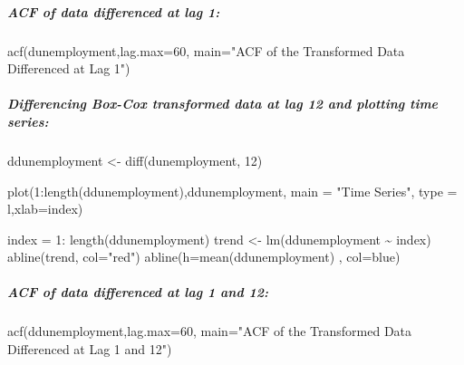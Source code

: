 \documentclass[
  letterpaper,
  DIV=11,
  numbers=noendperiod]{scrartcl}
\let\oldsubparagraph\subparagraph
\renewcommand{\subparagraph}[1]{\oldsubparagraph{#1}\mbox{}}
\newenvironment{Shaded}{\begin{snugshade}}{\end{snugshade}}
\newcommand{\AttributeTok}[1]{\textcolor[rgb]{0.40,0.45,0.13}{#1}}
\newcommand{\DecValTok}[1]{\textcolor[rgb]{0.68,0.00,0.00}{#1}}
\newcommand{\FunctionTok}[1]{\textcolor[rgb]{0.28,0.35,0.67}{#1}}
\newcommand{\NormalTok}[1]{\textcolor[rgb]{0.00,0.23,0.31}{#1}}
\newcommand{\OtherTok}[1]{\textcolor[rgb]{0.00,0.23,0.31}{#1}}
\newcommand{\SpecialCharTok}[1]{\textcolor[rgb]{0.37,0.37,0.37}{#1}}
\newcommand{\StringTok}[1]{\textcolor[rgb]{0.13,0.47,0.30}{#1}}
\begin{document}
\hypertarget{acf-of-data-differenced-at-lag-1}{%
\subparagraph{ACF of data differenced at lag
1:}\label{acf-of-data-differenced-at-lag-1}}

\begin{Shaded}
\begin{Highlighting}[]
\FunctionTok{acf}\NormalTok{(dunemployment,}\AttributeTok{lag.max=}\DecValTok{60}\NormalTok{, }\AttributeTok{main=}\StringTok{"ACF of the Transformed Data Differenced at Lag 1"}\NormalTok{)}
\end{Highlighting}
\end{Shaded}

\hypertarget{differencing-box-cox-transformed-data-at-lag-12-and-plotting-time-series}{%
\subparagraph{Differencing Box-Cox transformed data at lag 12 and
plotting time
series:}\label{differencing-box-cox-transformed-data-at-lag-12-and-plotting-time-series}}

\begin{Shaded}
\begin{Highlighting}[]
\NormalTok{ddunemployment }\OtherTok{\textless{}{-}} \FunctionTok{diff}\NormalTok{(dunemployment, }\DecValTok{12}\NormalTok{)}

\FunctionTok{plot}\NormalTok{(}\DecValTok{1}\SpecialCharTok{:}\FunctionTok{length}\NormalTok{(ddunemployment),ddunemployment, }\AttributeTok{main =} \StringTok{"Time Series"}\NormalTok{, }\AttributeTok{type =} \StringTok{\textquotesingle{}l\textquotesingle{}}\NormalTok{,}\AttributeTok{xlab=}\StringTok{\textquotesingle{}index\textquotesingle{}}\NormalTok{)}

\NormalTok{index }\OtherTok{=} \DecValTok{1}\SpecialCharTok{:} \FunctionTok{length}\NormalTok{(ddunemployment)}
\NormalTok{trend }\OtherTok{\textless{}{-}} \FunctionTok{lm}\NormalTok{(ddunemployment }\SpecialCharTok{\textasciitilde{}}\NormalTok{ index)}
\FunctionTok{abline}\NormalTok{(trend, }\AttributeTok{col=}\StringTok{"red"}\NormalTok{)}
\FunctionTok{abline}\NormalTok{(}\AttributeTok{h=}\FunctionTok{mean}\NormalTok{(ddunemployment) , }\AttributeTok{col=}\StringTok{\textquotesingle{}blue\textquotesingle{}}\NormalTok{)}
\end{Highlighting}
\end{Shaded}

\hypertarget{acf-of-data-differenced-at-lag-1-and-12}{%
\subparagraph{ACF of data differenced at lag 1 and
12:}\label{acf-of-data-differenced-at-lag-1-and-12}}

\begin{Shaded}
\begin{Highlighting}[]
\FunctionTok{acf}\NormalTok{(ddunemployment,}\AttributeTok{lag.max=}\DecValTok{60}\NormalTok{, }\AttributeTok{main=}\StringTok{"ACF of the Transformed Data Differenced at Lag 1 and 12"}\NormalTok{)}
\end{Highlighting}
\end{Shaded}
\end{document}
